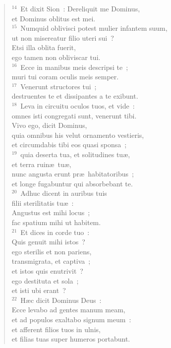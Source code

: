 \begin{verse}${}^{14}$~Et dixit Sion~: Dereliquit me Dominus,\\ et Dominus oblitus est mei.\\
${}^{15}$~Numquid oblivisci potest mulier infantem suum,\\ ut non misereatur filio uteri sui~?\\ Etsi illa oblita fuerit,\\ ego tamen non obliviscar tui.\\
${}^{16}$~Ecce in manibus meis descripsi te~;\\ muri tui coram oculis meis semper.\\
${}^{17}$~Venerunt structores tui~;\\ destruentes te et dissipantes a te exibunt.\\
${}^{18}$~Leva in circuitu oculos tuos, et vide~:\\ omnes isti congregati sunt, venerunt tibi.\\ Vivo ego, dicit Dominus,\\ quia omnibus his velut ornamento vestieris,\\ et circumdabis tibi eos quasi sponsa~;\\
${}^{19}$~quia deserta tua, et solitudines tu\ae ,\\ et terra ruin\ae\ tu\ae ,\\ nunc angusta erunt pr\ae\ habitatoribus~;\\ et longe fugabuntur qui absorbebant te.\\
${}^{20}$~Adhuc dicent in auribus tuis\\ filii sterilitatis tu\ae~:\\ Angustus est mihi locus~;\\ fac spatium mihi ut habitem.\\
${}^{21}$~Et dices in corde tuo~:\\ Quis genuit mihi istos~?\\ ego sterilis et non pariens,\\ transmigrata, et captiva~;\\ et istos quis enutrivit~?\\ ego destituta et sola~;\\ et isti ubi erant~?\\
${}^{22}$~H\ae c dicit Dominus Deus~:\\ Ecce levabo ad gentes manum meam,\\ et ad populos exaltabo signum meum~:\\ et afferent filios tuos in ulnis,\\ et filias tuas super humeros portabunt.\\

\end{verse}
